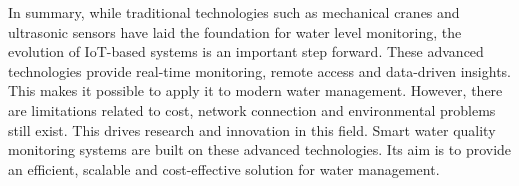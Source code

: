 {\noindent
In summary, while traditional technologies such as mechanical cranes and
ultrasonic sensors have laid the foundation for water level monitoring, the evolution
of IoT-based systems is an important step forward. These advanced technologies
provide real-time monitoring, remote access and data-driven insights. This makes it
possible to apply it to modern water management. However, there are limitations
related to cost, network connection and environmental problems still exist. This
drives research and innovation in this field. Smart water quality monitoring systems
are built on these advanced technologies. Its aim is to provide an efficient, scalable
and cost-effective solution for water management.
}